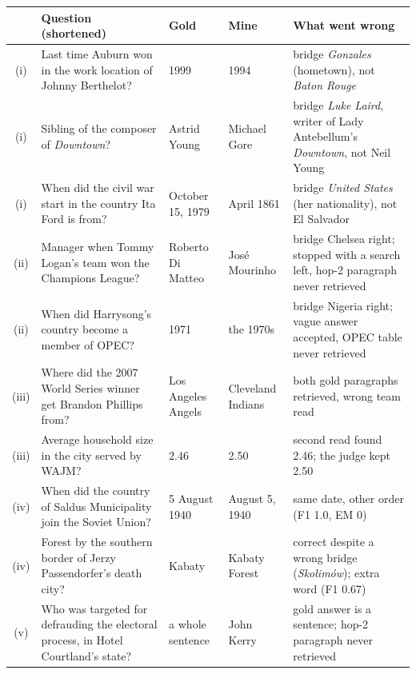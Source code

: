 \documentclass[10pt,a4paper]{article}
\begin{document}
\begin{center}
\footnotesize\renewcommand{\arraystretch}{1.12}
\begin{tabularx}{\textwidth}{@{}c>{\raggedright\arraybackslash}Xp{2.3cm}p{2.6cm}p{3.9cm}@{}}
\toprule
& Question (shortened) & Gold & Mine & What went wrong\\
\midrule
(i) & Last time Auburn won in the work location of Johnny Berthelot? & 1999 & 1994 & bridge \emph{Gonzales} (hometown), not \emph{Baton Rouge}\\
(i) & Sibling of the composer of \emph{Downtown}? & Astrid Young & Michael Gore & bridge \emph{Luke Laird}, writer of Lady Antebellum's \emph{Downtown}, not Neil Young\\
(i) & When did the civil war start in the country Ita Ford is from? & October 15, 1979 & April 1861 & bridge \emph{United States} (her nationality), not El Salvador\\
(ii) & Manager when Tommy Logan's team won the Champions League? & Roberto Di Matteo & Jos\'e Mourinho & bridge Chelsea right; stopped with a search left, hop-2 paragraph never retrieved\\
(ii) & When did Harrysong's country become a member of OPEC? & 1971 & the 1970s & bridge Nigeria right; vague answer accepted, OPEC table never retrieved\\
(iii) & Where did the 2007 World Series winner get Brandon Phillips from? & Los Angeles Angels & Cleveland Indians & both gold paragraphs retrieved, wrong team read\\
(iii) & Average household size in the city served by WAJM? & 2.46 & 2.50 & second read found 2.46; the judge kept 2.50\\
(iv) & When did the country of Saldus Municipality join the Soviet Union? & 5 August 1940 & August 5, 1940 & same date, other order (F1 1.0, EM 0)\\
(iv) & Forest by the southern border of Jerzy Passendorfer's death city? & Kabaty & Kabaty Forest & correct despite a wrong bridge (\emph{Skolim\'ow}); extra word (F1 0.67)\\
(v) & Who was targeted for defrauding the electoral process, in Hotel Courtland's state? & a whole sentence & John Kerry & gold answer is a sentence; hop-2 paragraph never retrieved\\
\bottomrule
\end{tabularx}
\label{tab:err}
\end{center}
\end{document}
